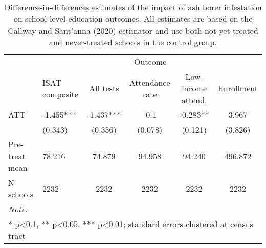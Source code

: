 \begin{table}[!h]

\caption{\label{tab:school-educ-table}Difference-in-differences estimates of the impact of ash borer infestation on school-level education outcomes. All estimates are based on the Callway and Sant'anna (2020) estimator and use both not-yet-treated and never-treated schools in the control group.}
\centering
\begin{tabular}[t]{llcccc}
\toprule
\multicolumn{1}{c}{ } & \multicolumn{5}{c}{Outcome} \\
\cmidrule(l{3pt}r{3pt}){2-6}
  & ISAT composite & All tests & Attendance rate & Low-income attend. & Enrollment\\
\midrule
ATT & -1.455*** & -1.437*** & -0.1 & -0.283** & 3.967\\
 & (0.343) & (0.356) & (0.078) & (0.121) & (3.826)\\
\midrule
Pre-treat mean & 78.216 & 74.879 & 94.958 & 94.240 & 496.872\\
N schools & 2232 & 2232 & 2232 & 2232 & 2232\\
\bottomrule
\multicolumn{6}{l}{\rule{0pt}{1em}\textit{Note: }}\\
\multicolumn{6}{l}{\rule{0pt}{1em}* p<0.1, ** p<0.05, *** p<0.01; standard errors clustered at census tract}\\
\end{tabular}
\end{table}
